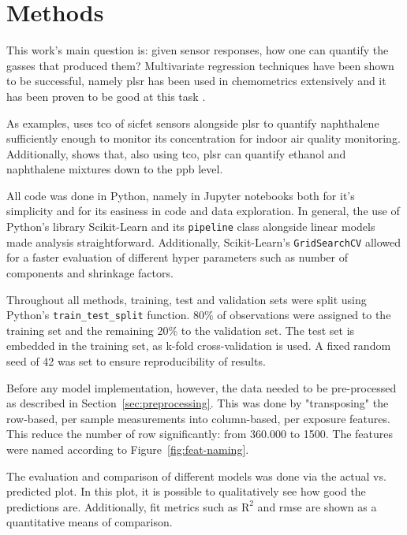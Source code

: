\chapter{Methods}
\label{cha:methods}

This work's main question is: given sensor responses, how one can quantify the gasses that produced them? Multivariate regression techniques have been shown to be successful, namely \acrfull{plsr} has been used in chemometrics extensively and it has been proven to be good at this task \parencite{Bastuck_2019} \parencite{wold2011}.

As examples, \textcite{BUR2015225} uses \acrshort{tco} of \acrshort{sicfet} sensors alongside \acrshort{plsr} to quantify naphthalene sufficiently enough to monitor its concentration for indoor air quality monitoring. Additionally, \textcite{BASTUCK2016263} shows that, also using \acrshort{tco}, \acrshort{plsr} can  quantify ethanol and naphthalene mixtures down to the \acrfull{ppb} level.

All code was done in Python, namely in Jupyter notebooks both for it's simplicity and for its easiness in code and data exploration. In general, the use of Python's library Scikit-Learn and its \texttt{pipeline} class alongside linear models made analysis straightforward. Additionally, Scikit-Learn's \texttt{GridSearchCV} allowed for a faster evaluation of different hyper parameters such as number of components and shrinkage factors. 

Throughout all methods, training, test and validation sets were split using Python's \texttt{train\_test\_split} function. 80\% of observations were assigned to the training set and the remaining 20\% to the validation set. The test set is embedded in the training set, as k-fold cross-validation is used. A fixed random seed of 42 was set to ensure reproducibility of results. 

Before any model implementation, however, the data needed to be pre-processed as described in Section~\ref{sec:preprocessing}. This was done by "transposing" the row-based, per sample  measurements into column-based, per exposure features. This reduce the number of row significantly: from 360.000 to 1500. The features were named according to Figure~\ref{fig:feat-naming}.

The evaluation and comparison of different models was done via the actual vs. predicted  plot. In this plot, it is possible to qualitatively see how good the predictions are. Additionally, fit metrics such as $\text{R}^2$ and \acrshort{rmse} are shown as a quantitative means of comparison.

